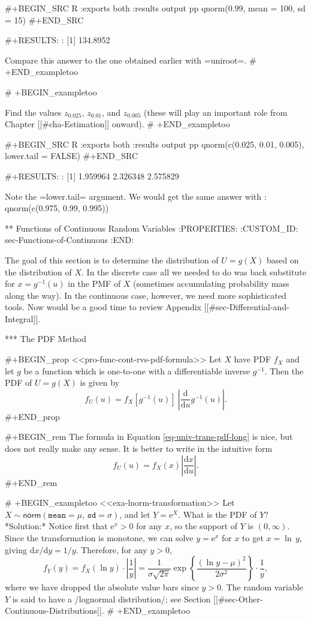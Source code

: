 #+BEGIN_SRC R :exports both :results output pp 
qnorm(0.99, mean = 100, sd = 15)
#+END_SRC

#+RESULTS:
: [1] 134.8952

Compare this answer to the one obtained earlier with =uniroot=.
# +END_exampletoo


# +BEGIN_exampletoo

Find the values \(z_{0.025}\), \(z_{0.01}\), and \(z_{0.005}\) (these
will play an important role from Chapter [[#cha-Estimation]] onward).
# +END_exampletoo


#+BEGIN_SRC R :exports both :results output pp 
qnorm(c(0.025, 0.01, 0.005), lower.tail = FALSE)
#+END_SRC

#+RESULTS:
: [1] 1.959964 2.326348 2.575829

Note the =lower.tail= argument. We would get the same answer with
: qnorm(c(0.975, 0.99, 0.995))

** Functions of Continuous Random Variables
:PROPERTIES:
:CUSTOM_ID: sec-Functions-of-Continuous
:END:

The goal of this section is to determine the distribution of
\(U=g(X)\) based on the distribution of \(X\). In the discrete case
all we needed to do was back substitute for \(x=g^{-1}(u)\) in the PMF
of \(X\) (sometimes accumulating probability mass along the way). In
the continuous case, however, we need more sophisticated tools. Now
would be a good time to review Appendix [[#sec-Differential-and-Integral]].

*** The PDF Method

#+BEGIN_prop
<<pro-func-cont-rvs-pdf-formula>> Let \(X\) have PDF \(f_{X}\) and let
\(g\) be a function which is one-to-one with a differentiable inverse
\(g^{-1}\). Then the PDF of \(U=g(X)\) is given by
\begin{equation}
\label{eq-univ-trans-pdf-long}
f_{U}(u)=f_{X}\left[g^{-1}(u)\right]\ \left|\frac{\mathrm{d}}{\mathrm{d} u}g^{-1}(u)\right|.
\end{equation}
#+END_prop

#+BEGIN_rem
The formula in Equation \eqref{eq-univ-trans-pdf-long} is nice, but does not
really make any sense. It is better to write in the intuitive form
\begin{equation}
\label{eq-univ-trans-pdf-short}
f_{U}(u)=f_{X}(x)\left|\frac{\mathrm{d} x}{\mathrm{d} u}\right|.
\end{equation}
#+END_rem

# +BEGIN_exampletoo
<<exa-lnorm-transformation>> Let
\(X\sim\mathsf{norm}(\mathtt{mean}=\mu,\,\mathtt{sd}=\sigma)\), and
let \(Y=\mathrm{e}^{X}\). What is the PDF of \(Y\)?  *Solution:*
Notice first that \(\mathrm{e}^{x}>0\) for any \(x\), so the support
of \(Y\) is \((0,\infty)\). Since the transformation is monotone, we
can solve \(y=\mathrm{e}^{x}\) for \(x\) to get \(x=\ln\, y\), giving
\(\mathrm{d} x/\mathrm{d} y=1/y\). Therefore, for any \(y>0\), \[
f_{Y}(y)=f_{X}(\ln
y)\cdot\left|\frac{1}{y}\right|=\frac{1}{\sigma\sqrt{2\pi}}\exp\left\{
\frac{(\ln y-\mu)^{2}}{2\sigma^{2}}\right\} \cdot\frac{1}{y}, \] where
we have dropped the absolute value bars since \(y>0\). The random
variable \(Y\) is said to have a /lognormal distribution/; see Section
[[#sec-Other-Continuous-Distributions]].
# +END_exampletoo


